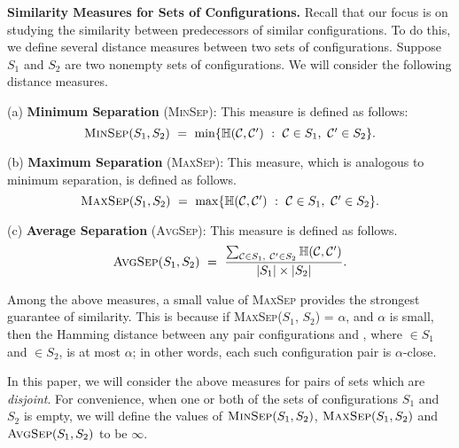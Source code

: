 \smallskip

\noindent
\textbf{Similarity Measures for Sets of Configurations.} Recall
that our focus is on studying the similarity between predecessors
of similar configurations.
To do this, we define several distance measures between two sets of
configurations.
Suppose $S_1$ and $S_2$ are two nonempty sets of configurations.
We will consider the following distance measures.

\newcommand{\minsep}{\mbox{\textsc{MinSep}}}
\newcommand{\maxsep}{\mbox{\textsc{MaxSep}}}
\newcommand{\avgsep}{\mbox{\textsc{AvgSep}}}

\begin{description}
\item{(a)} \textbf{Minimum Separation} (\minsep): This measure is defined as follows:
\[ 
\minsep(S_1, S_2) ~=~ \min\{ \calh(\calc, \calcp) ~:~ 
                                \calc{} \in S_1,~ \calcp{} \in S_2\}.
\]
\item{(b)} \textbf{Maximum Separation} (\maxsep): This measure, which is
analogous to minimum separation, is defined as follows.
\[ 
\maxsep(S_1, S_2) ~=~ \max\{ \calh(\calc, \calcp) ~:~ 
                                \calc{} \in S_1,~ \calcp{} \in S_2\}.
\]
\item{(c)} \textbf{Average Separation} (\avgsep): This measure is defined as follows.
\[ 
\avgsep(S_1, S_2) ~=~ \displaystyle{\frac{\sum_{\mathcal{C} \in S_1,~ \mathcal{C}' \in S_2}
                            \calh(\calc, \calcp)}{|S_1| \times |S_2|}}.
\]
\end{description}
Among the above measures, a small value of \maxsep{} provides the 
strongest guarantee of similarity.
This is because if \maxsep($S_1$, $S_2$) = $\alpha$, and $\alpha$ is small,
then the Hamming distance
between any pair configurations \calc{} and \calcp, where \calc{} $\in S_1$
and \calcp{} $\in S_2$, is at most $\alpha$; in other words, 
each such configuration pair is $\alpha$-close.

\smallskip

In this paper, we will consider the above measures for pairs of sets
which are \emph{disjoint}.
For convenience, when one or both of the sets of configurations
$S_1$ and $S_2$ is empty, we will define the values of 
$\minsep(S_1, S_2)$,
$\maxsep(S_1, S_2)$ and $\avgsep(S_1, S_2)$ to be $\infty$.


\smallskip

